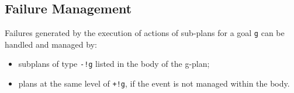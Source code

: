 %
%
%
%
%
%
%
%
% 
% 

 \subsection{Failure Management}

 Failures generated by the execution of actions of sub-plans for a
 goal \texttt{g} can be handled and managed by:

\begin{itemize}
\item subplans of type \texttt{-!g} listed in the body of the g-plan;
\item plans at the same level of \texttt{+!g}, if the event is not
  managed within the body.
\end{itemize}

